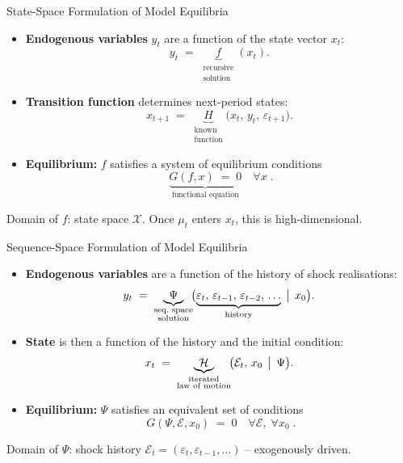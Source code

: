\documentclass[aspectratio=169,11pt]{beamer}
\newcommand{\emphc}[1]{\textcolor{harvardcrimson}{#1}}
\newcommand{\E}{\mathcal{E}}
\begin{document}
\begin{frame}{State-Space Formulation of Model Equilibria}
\vspace{0.2em}
\begin{itemize}\itemsep10pt
\item \textbf{Endogenous variables} $y_t$ are a function of the state vector $x_t$:
\[
y_t \;=\; \underbrace{f}_{\substack{\text{recursive}\\ \text{solution}}}\!(x_t).
\]

\item \textbf{Transition function} determines next-period states:
\[
x_{t+1} \;=\; \underbrace{H}_{\substack{\text{known}\\ \text{function}}}\!\bigl(x_t,\, y_t,\, \varepsilon_{t+1}\bigr).
\]

\item \textbf{Equilibrium:} $f$ satisfies a system of equilibrium conditions
\[
\boxed{\;\underbrace{G(f, x) \;=\; 0}_{\text{functional equation}} \quad \forall x\;.}
\]
\end{itemize}
\vspace{0.2em}
{\footnotesize Domain of $f$: state space $\mathcal{X}$. Once $\mu_t$ enters $x_t$, this is high-dimensional.}
\end{frame}


\begin{frame}{Sequence-Space Formulation of Model Equilibria}
\vspace{0.2em}
\begin{itemize}\itemsep10pt
\item \textbf{Endogenous variables} are a function of the history of shock realisations:
\[
y_t \;=\; \underbrace{\Psi}_{\substack{\text{seq.\ space}\\ \text{solution}}}\!\bigl(\underbrace{\varepsilon_t,\,\varepsilon_{t-1},\,\varepsilon_{t-2},\,\ldots}_{\text{history}}\,\bigm|\, x_0\bigr).
\]

\item \textbf{State} is then a function of the history and the initial condition:
\[
x_t \;=\; \underbrace{\mathcal{H}}_{\substack{\text{iterated}\\ \text{law of motion}}}\!\bigl(\E_t,\, x_0 \,\bigm|\, \Psi\bigr).
\]

\item \textbf{Equilibrium:} $\Psi$ satisfies an equivalent set of conditions
\[
\boxed{\;G(\Psi, \E, x_0) \;=\; 0 \quad \forall \E,\;\forall x_0\;.}
\]
\end{itemize}
\vspace{0.2em}
{\footnotesize Domain of $\Psi$: shock history $\E_t = (\varepsilon_t, \varepsilon_{t-1}, \ldots)$ -- \emphc{exogenously driven}.}
\end{frame}
\end{document}
